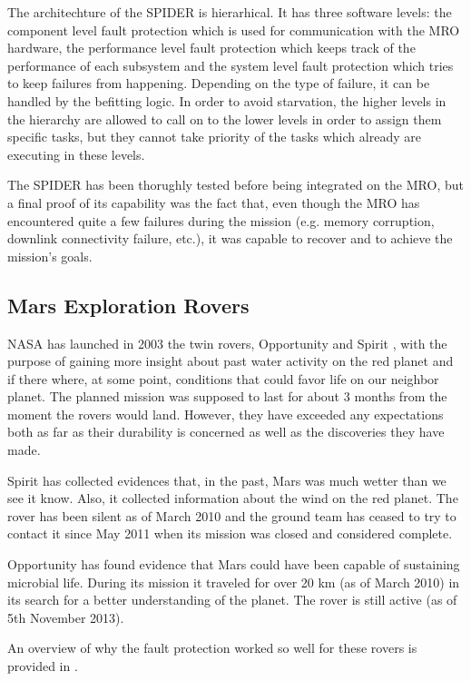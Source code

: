 The architechture of the SPIDER is hierarhical. It has three software
levels: the component level fault protection which is used for communication
with the MRO hardware, the performance level fault protection which keeps track of the
performance of each subsystem and the system level fault protection which tries
to keep failures from happening. Depending on the type of failure, it can be
handled by the befitting logic. In order to avoid starvation, the higher levels
in the hierarchy are allowed to call on to the lower levels in order to assign
them specific tasks, but they cannot take priority of the tasks which
already are executing in these levels.

The SPIDER has been thorughly tested before being integrated on the MRO, but a
final proof of its capability was the fact that, even though the MRO has
encountered quite a few failures during the mission (e.g. memory corruption,
downlink connectivity failure, etc.), it was capable to recover and to achieve
the mission's goals.

\subsection{Mars Exploration Rovers}

NASA has launched in 2003 the twin rovers, Opportunity and Spirit
\cite{mer-nasa}, with the purpose of gaining more insight about past water
activity on the red planet and if there where, at some point, conditions that
could favor life on our neighbor planet. The planned mission was supposed to
last for about 3 months from the moment the rovers would land. However, they
have exceeded any expectations both as far as their durability is concerned as
well as the discoveries they have made.

Spirit has collected evidences that, in the past, Mars was much wetter than we
see it know. Also, it collected information about the wind on the red planet.
The rover has been silent as of March 2010 and the ground team has ceased to try
to contact it since May 2011 when its mission was closed and considered
complete.

Opportunity has found evidence that Mars could have been capable of sustaining
microbial life. During its mission it traveled for over 20 km (as of March 2010)
in its search for a better understanding of the planet. The rover is still
active (as of 5th November 2013).

An overview of why the fault protection worked so well for these rovers is
provided in \cite{surv-nasa-mars}.

